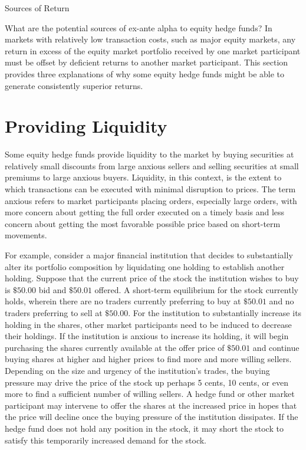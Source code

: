 \documentclass[11pt]{article}
\begin{document}
Sources of Return

What are the potential sources of ex-ante alpha to equity hedge funds? In markets with relatively low transaction costs, such as major equity markets, any return in excess of the equity market portfolio received by one market participant must be offset by deficient returns to another market participant. This section provides three explanations of why some equity hedge funds might be able to generate consistently superior returns.

\section*{Providing Liquidity}
Some equity hedge funds provide liquidity to the market by buying securities at relatively small discounts from large anxious sellers and selling securities at small premiums to large anxious buyers. Liquidity, in this context, is the extent to which transactions can be executed with minimal disruption to prices. The term anxious refers to market participants placing orders, especially large orders, with more concern about getting the full order executed on a timely basis and less concern about getting the most favorable possible price based on short-term movements.

For example, consider a major financial institution that decides to substantially alter its portfolio composition by liquidating one holding to establish another holding. Suppose that the current price of the stock the institution wishes to buy is $\$ 50.00$ bid and $\$ 50.01$ offered. A short-term equilibrium for the stock currently holds, wherein there are no traders currently preferring to buy at $\$ 50.01$ and no traders preferring to sell at $\$ 50.00$. For the institution to substantially increase its holding in the shares, other market participants need to be induced to decrease their holdings. If the institution is anxious to increase its holding, it will begin purchasing the shares currently available at the offer price of $\$ 50.01$ and continue buying shares at higher and higher prices to find more and more willing sellers. Depending on the size and urgency of the institution's trades, the buying pressure may drive the price of the stock up perhaps 5 cents, 10 cents, or even more to find a sufficient number of willing sellers. A hedge fund or other market participant may intervene to offer the shares at the increased price in hopes that the price will decline once the buying pressure of the institution dissipates. If the hedge fund does not hold any position in the stock, it may short the stock to satisfy this temporarily increased demand for the stock.
\end{document}
